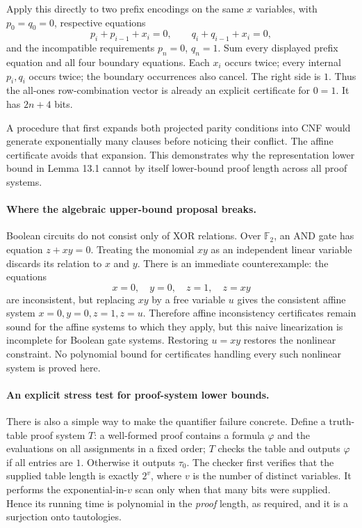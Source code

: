 \documentclass[11pt]{article}
\begin{document}
Apply this directly to two prefix encodings on the same $x$ variables, with
$p_0=q_0=0$, respective equations
\[
 p_i+p_{i-1}+x_i=0,\qquad q_i+q_{i-1}+x_i=0,
\]
and the incompatible requirements $p_n=0$, $q_n=1$. Sum every displayed
prefix equation and all four boundary equations. Each $x_i$ occurs twice;
every internal $p_i,q_i$ occurs twice; the boundary occurrences also cancel.
The right side is $1$. Thus the all-ones row-combination vector is already
an explicit certificate for $0=1$. It has $2n+4$ bits.

A procedure that first expands both projected parity conditions into CNF
would generate exponentially many clauses before noticing their conflict.
The affine certificate avoids that expansion. This demonstrates why the
representation lower bound in Lemma 13.1 cannot by itself lower-bound proof
length across all proof systems.

\paragraph{Where the algebraic upper-bound proposal breaks.}
Boolean circuits do not consist only of XOR relations. Over $\mathbb F_2$,
an AND gate has equation $z+xy=0$. Treating the monomial $xy$ as an independent
linear variable discards its relation to $x$ and $y$. There is an immediate
counterexample: the equations
\[
                    x=0,\quad y=0,\quad z=1,\quad z=xy
\]
are inconsistent, but replacing $xy$ by a free variable $u$ gives the
consistent affine system $x=0,y=0,z=1,z=u$. Therefore affine inconsistency
certificates remain sound for the affine systems to which they apply, but
this naive linearization is incomplete for Boolean gate systems. Restoring
$u=xy$ restores the nonlinear constraint. No polynomial bound for certificates
handling every such nonlinear system is proved here.

\paragraph{An explicit stress test for proof-system lower bounds.}
There is also a simple way to make the quantifier failure concrete. Define
a truth-table proof system $T$: a well-formed proof contains a formula
$\varphi$ and the evaluations on all assignments in a fixed order; $T$
checks the table and outputs $\varphi$ if all entries are $1$. Otherwise it
outputs $\tau_0$. The checker first verifies that the supplied table length
is exactly $2^v$, where $v$ is the number of distinct variables. It performs
the exponential-in-$v$ scan only when that many bits were supplied. Hence
its running time is polynomial in the \emph{proof} length, as required, and
it is a surjection onto tautologies.
\end{document}
